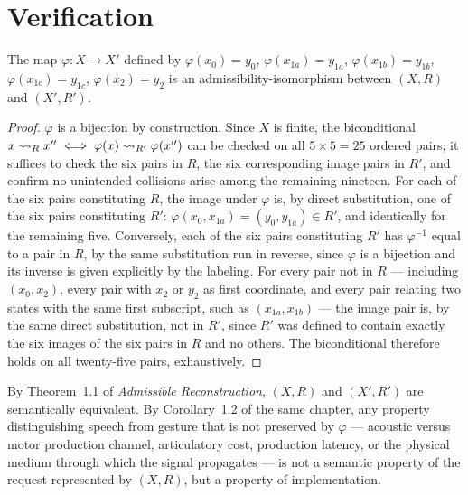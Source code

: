 \section{Verification}

\begin{proposition}
\label{prop:worked-iso}
The map $\varphi : X \to X'$ defined by $\varphi(x_0) = y_0$, $\varphi(x_{1a}) = y_{1a}$, $\varphi(x_{1b}) = y_{1b}$, $\varphi(x_{1c}) = y_{1c}$, $\varphi(x_2) = y_2$ is an admissibility-isomorphism between $(X, R)$ and $(X', R')$.
\end{proposition}

\begin{proof}
$\varphi$ is a bijection by construction. Since $X$ is finite, the biconditional $x \rightsquigarrow_{R} x'' \iff \varphi(x) \rightsquigarrow_{R'} \varphi(x'')$ can be checked on all $5 \times 5 = 25$ ordered pairs; it suffices to check the six pairs in $R$, the six corresponding image pairs in $R'$, and confirm no unintended collisions arise among the remaining nineteen. For each of the six pairs constituting $R$, the image under $\varphi$ is, by direct substitution, one of the six pairs constituting $R'$: $\varphi(x_0, x_{1a}) = (y_0, y_{1a}) \in R'$, and identically for the remaining five. Conversely, each of the six pairs constituting $R'$ has $\varphi^{-1}$ equal to a pair in $R$, by the same substitution run in reverse, since $\varphi$ is a bijection and its inverse is given explicitly by the labeling. For every pair not in $R$ --- including $(x_0, x_2)$, every pair with $x_2$ or $y_2$ as first coordinate, and every pair relating two states with the same first subscript, such as $(x_{1a}, x_{1b})$ --- the image pair is, by the same direct substitution, not in $R'$, since $R'$ was defined to contain exactly the six images of the six pairs in $R$ and no others. The biconditional therefore holds on all twenty-five pairs, exhaustively.
\end{proof}

\begin{corollary}
\label{cor:worked-invariance}
By Theorem~1.1 of \emph{Admissible Reconstruction}, $(X, R)$ and $(X', R')$ are semantically equivalent. By Corollary~1.2 of the same chapter, any property distinguishing speech from gesture that is not preserved by $\varphi$ --- acoustic versus motor production channel, articulatory cost, production latency, or the physical medium through which the signal propagates --- is not a semantic property of the request represented by $(X, R)$, but a property of implementation.
\end{corollary}

